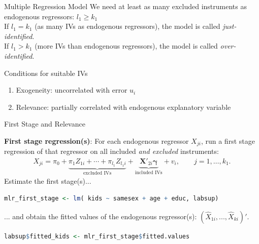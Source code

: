 \documentclass[9pt,aspectratio=169, xcolor=dvipsnames]{beamer}
\begin{document}
\begin{frame}{Multiple Regression Model}
We \alert{need at least as many excluded instruments as endogenous regressors: $l_1 \geq k_1$} \\
If {$l_1 = k_1$} (as many IVs as endogenous regressors), the model is called \textit{just-identified}. \\
If {$l_1  > k_1$} (more IVs than endogenous regressors), the model is called \textit{over-identified}.

\bigskip

\begin{block}{Conditions for suitable IVs}
\begin{enumerate}
    \item Exogeneity: uncorrelated with error  $u_i$
    \item Relevance: \alert{partially} correlated with endogenous explanatory variable
\end{enumerate}
\end{block}
\end{frame}

\begin{frame}[fragile]{First Stage and Relevance}

\textbf{First stage regression(s)}:  For each \alert{endogenous} regressor $X_{ji}$, run a first stage regression of that regressor on all included \alert{\emph{and excluded}} instruments:
\begin{align*}
X_{ji} 
    = \pi_0 
    + \underbrace{\pi_1 Z_{1i} + \cdots + \pi_{l_1} Z_{l_1 i}}_{\text{excluded IVs}} 
    + \underbrace{\boldsymbol{X}'_{2i}\boldsymbol{\gamma}}_{\text{included IVs}} 
    + v_i,
    \qquad j = 1, \ldots, k_1.
\end{align*}
\pause
Estimate the first stage(s)... 
\begin{lstlisting}[language=R]
    mlr_first_stage <- lm( kids ~ samesex + age + educ, labsup)
\end{lstlisting}
\pause
... and obtain the fitted values of the endogenous regressor(s): $(\hat{X}_{1i}, ..., \hat{X}_{ki})'$.
\begin{lstlisting}[language=R]
    labsup$fitted_kids <- mlr_first_stage$fitted.values
\end{lstlisting}

\end{frame}
\end{document}
